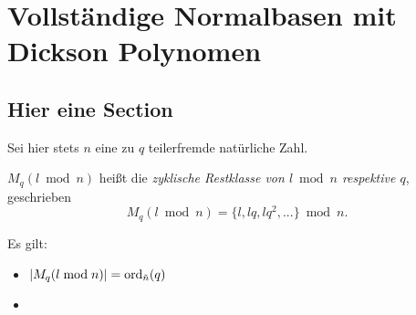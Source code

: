 
\chapter{Vollständige Normalbasen mit Dickson Polynomen}

\section{Hier eine Section}

Sei hier stets $n$ eine zu $q$ teilerfremde natürliche Zahl.

\begin{notation}
  $M_q(l\bmod n)$ heißt die \emph{zyklische Restklasse von $l\bmod n$ respektive
  $q$}, geschrieben
  \[ M_q(l\bmod n) = \{l,lq,lq^2,...\} \bmod n.\]
\end{notation}


\begin{lemma}
  Es gilt:
  \begin{itemize}
    \item $| M_q(l\bmod n)| = \operatorname{ord}_{\tilde n}(q)$
    \item 
  \end{itemize}
\end{lemma}

\lipsum

\lipsum
